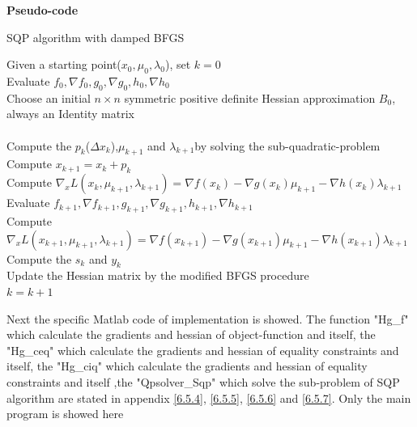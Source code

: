 {\setmainfont{Times New Roman}\bfseries Pseudo-code}
\begin{algorithm}[H]
	\caption{ SQP algorithm with damped BFGS}
	\begin{algorithmic}[1]
	    \STATE Given a starting point($x_0,\mu_0,\lambda_0$), set $k=0$\\
		\STATE Evaluate $f_0,\nabla f_0,g_0,\nabla g_0,h_0,\nabla h_0$\\
		\STATE Choose an initial $n \times n$ symmetric positive definite Hessian approximation $B_0$, always an Identity matrix\\
        \\
		\STATE Compute the $p_k$($\Delta x_k$),$\mu_{k+1}$ and $\lambda_{k+1}$by solving the sub-quadratic-problem\\
		\STATE Compute $x_{k+1}=x_k+p_k$\\
		\STATE Compute $\nabla_{x}L\left(x_{k}, \mu_{k+1},\lambda_{k+1}\right)=\nabla f(x_k)-\nabla g(x_k)\mu_{k+1}-\nabla h(x_k)\lambda_{k+1}$\\
		\STATE Evaluate $f_{k+1},\nabla f_{k+1},g_{k+1},\nabla g_{k+1},h_{k+1},\nabla h_{k+1}$\\
		\STATE Compute $\nabla_{x}L\left(x_{k+1}, \mu_{k+1},\lambda_{k+1}\right)=\nabla f(x_{k+1})-\nabla g(x_{k+1})\mu_{k+1}-\nabla h(x_{k+1})\lambda_{k+1}$\\
		\STATE Compute the $s_k$ and $y_k$\\
		\STATE Update the Hessian matrix by the modified BFGS procedure\\
		\STATE $k=k+1$\\
		\ENDWHILE
    \end{algorithmic}
\end{algorithm}
Next the specific Matlab code of implementation is showed. The function "Hg_f" which calculate the gradients and hessian of object-function and itself, the "Hg_ceq" which calculate the gradients and hessian of equality constraints and itself, the "Hg_ciq" which calculate the gradients and hessian of equality constraints and itself ,the "Qpsolver_Sqp" which solve the sub-problem of SQP algorithm are stated in appendix \ref{6.5.4}, \ref{6.5.5}, \ref{6.5.6} and \ref{6.5.7}. Only the main program is showed here\\

